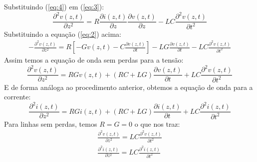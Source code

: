 \documentclass[11pt,a4paper]{article}
\begin{document}
Substituindo (\ref{eq:4}) em (\ref{eq:3}):
\begin{equation*}
  \frac{\partial^2 v(z,t)}{\partial z^2} = R \frac{\partial i(z,t)}{\partial z} \frac{\partial v(z,t)}{\partial z} - LC \frac{\partial^2 v(z,t)}{\partial t^2}
\end{equation*}
Substituindo a equação (\ref{eq:2}) acima:
\begin{align*}
  - \frac{\partial^2 v(z,t)}{\partial  z^2} = R \left[ -Gv(z,t) -C \frac{\partial v(z,t)}{\partial t}  \right]- LG \frac{\partial v(z,t)}{\partial t} - LC \frac{\partial^2 v(z,t)}{\partial t^2}
\end{align*}
Assim temos a equação de onda sem perdas para a tensão:
\begin{equation*}
  \frac{\partial^2 v(z,t)}{\partial  z^2}= RGv(z,t) + (RC+LG) \frac{\partial v(z,t)}{\partial t} + LC \frac{\partial^2 v(z,t)}{\partial t^2}
\end{equation*}
E de forma análoga ao procedimento anterior, obtemos a equação de onda para a corrente:
\begin{equation*}
  \frac{\partial^2 i(z,t)}{\partial z^2}  = RGi(z,t) + (RC+LG) \frac{\partial i(z,t)}{\partial t}+ LC \frac{\partial^2 i(z,t)}{\partial t^2}
\end{equation*}
Para linhas sem perdas, temos $R=G=0$ o que nos traz:
\begin{align*}
  \frac{\partial^2 v(z,t)}{\partial  z^2}= LC \frac{\partial^2 v(z,t)}{\partial t^2} \\
  \frac{\partial^2 i(z,t)}{\partial z^2}= LC \frac{\partial ^2 i(z,t)}{\partial t^2}
\end{align*}
\end{document}
